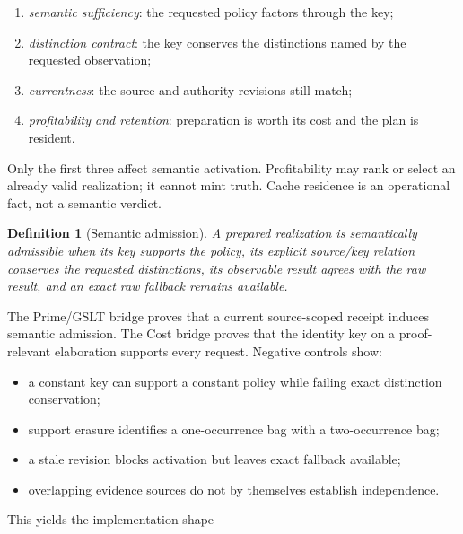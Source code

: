 \documentclass[11pt]{article}
\newtheorem{definition}[theorem]{Definition}
\begin{document}
\begin{enumerate}
\item \emph{semantic sufficiency}: the requested policy factors through the key;
\item \emph{distinction contract}: the key conserves the distinctions named by the
      requested observation;
\item \emph{currentness}: the source and authority revisions still match;
\item \emph{profitability and retention}: preparation is worth its cost and the plan
      is resident.
\end{enumerate}

Only the first three affect semantic activation.  Profitability may rank or select an
already valid realization; it cannot mint truth.  Cache residence is an operational
fact, not a semantic verdict.

\begin{definition}[Semantic admission]
A prepared realization is semantically admissible when its key supports the policy,
its explicit source/key relation conserves the requested distinctions, its observable
result agrees with the raw result, and an exact raw fallback remains available.
\end{definition}

The Prime/GSLT bridge proves that a current source-scoped receipt induces semantic
admission.  The Cost bridge proves that the identity key on a proof-relevant
elaboration supports every request.  Negative controls show:

\begin{itemize}
\item a constant key can support a constant policy while failing exact distinction
      conservation;
\item support erasure identifies a one-occurrence bag with a two-occurrence bag;
\item a stale revision blocks activation but leaves exact fallback available;
\item overlapping evidence sources do not by themselves establish independence.
\end{itemize}

This yields the implementation shape

\begin{center}
\end{center}
\end{document}
